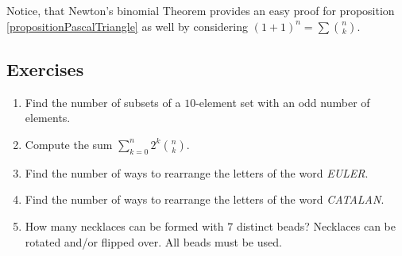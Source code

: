 Notice, that Newton's binomial Theorem provides an easy proof for proposition \ref{propositionPascalTriangle} as well by considering $(1+1)^n=\sum {n \choose k}$.

\subsection{Exercises}

\begin{enumerate}
    \item Find the number of subsets of a $10$-element set with an odd number of elements.
    \item Compute the sum $\displaystyle \sum_{k=0}^n 2^k {n \choose k}$.
    \item Find the number of ways to rearrange the letters of the word \textit{EULER}.
    \item Find the number of ways to rearrange the letters of the word \textit{CATALAN}.
    \item How many necklaces can be formed with $7$ distinct beads? Necklaces can be rotated and/or flipped over. All beads must be used.
\end{enumerate}